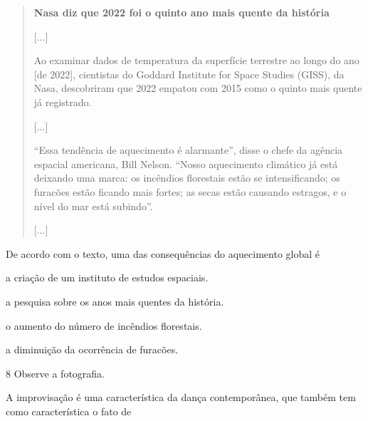 \begin{quote}
\textbf{Nasa diz que 2022 foi o quinto ano mais quente da história}

{[}...{]}

Ao examinar dados de temperatura da superfície terrestre ao longo do ano
[de 2022], cientistas do Goddard Institute for Space Studies (GISS), da
Nasa, descobriram que 2022 empatou com 2015 como o quinto mais quente já
registrado.

{[}...{]}

“Essa tendência de aquecimento é alarmante”, disse o chefe da agência
espacial americana, Bill Nelson. “Nosso aquecimento climático já está
deixando uma marca: os incêndios florestais estão se intensificando; os
furacões estão ficando mais fortes; as secas estão causando estragos, e
o nível do mar está subindo”.

{[}...{]}

\end{quote}

De acordo com o texto, uma das consequências do aquecimento global é

\begin{escolha}
\item a criação de um instituto de estudos espaciais.

\item a pesquisa sobre os anos mais quentes da história.

\item o aumento do número de incêndios florestais.

\item a diminuição da ocorrência de furacões.
\end{escolha}


\num{8}  Observe a fotografia.


A improvisação é uma característica da dança contemporânea, que também tem como característica o fato de

